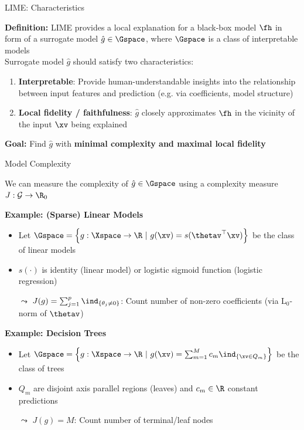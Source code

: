 \documentclass[11pt,compress,t,notes=noshow, aspectratio=169, xcolor=table]{beamer}
\newcommand{\gh}{\hat{g}}
\begin{document}
\begin{frame}{LIME: Characteristics}

    \textbf{Definition:}
	LIME provides a local explanation for a black-box model $\fh$ in form of a surrogate model $\gh \in \Gspace$, where $\Gspace$ is a class of interpretable models\\[2em]
	
	
	Surrogate model $\gh$ should satisfy two characteristics:
	\begin{enumerate}
		\item \textbf{Interpretable}: Provide human-understandable insights into the relationship between input features and prediction (e.g. via coefficients, model structure)
	\item \textbf{Local fidelity / faithfulness}: 
    $\gh$ closely approximates $\fh$ in the vicinity of the input $\xv$ being explained
	\end{enumerate}
	
	\vspace{2em}
	\textbf{Goal:} Find $\gh$ with \textbf{minimal complexity and maximal local fidelity} 
\end{frame}


\begin{frame}{Model Complexity}
    
    We can measure the complexity of $\gh \in \Gspace$ using a complexity measure $J: \mathcal{G} \to \R_{0}$ \lz %

 	\textbf{Example: (Sparse) Linear Models}\\
 	\begin{itemize}
 	    \item Let $\Gspace = \left\{g: \Xspace \to \R ~|~g(\xv) = s(\thetav^\top \xv)\right\}$ be the class of linear models
 	    \item $s(\cdot)$ is identity (linear model) or logistic sigmoid function  (logistic regression)
 	    \item[$\leadsto$] $J(g) = \sum_{j = 1}^p \ind_{\{ \theta_j \neq 0 \}}$: Count number of non-zero coefficients (via L$_0$-norm of $\thetav$)
 	\end{itemize}
 	\lz\pause
 	
 	\textbf{Example: Decision Trees}\\
 	\begin{itemize}
 	    \item Let $\Gspace = \left\{g:\Xspace \to \R ~|~g(\xv) = \sum_{m=1}^M c_m \ind_{\{ \xv \in Q_m \}}\right\}$ be the class of trees
        \item $Q_m$ are disjoint axis parallel regions (leaves) and $c_m \in \R$ constant predictions
 	    \item[$\leadsto$] $J(g) = M$: Count number of terminal/leaf nodes
 	\end{itemize}
 	
\end{frame}
 
\end{document}
